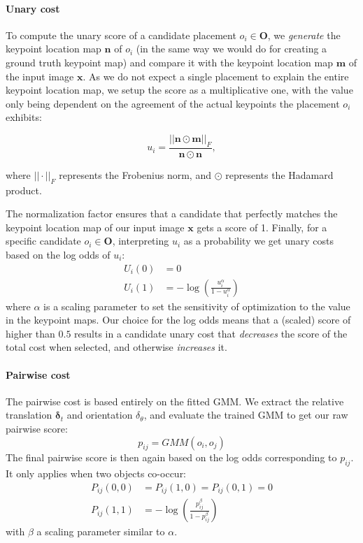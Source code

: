 \documentclass[10pt,twocolumn,letterpaper]{article}
\newcommand{\bb}[1]{{\bm{#1}}}
\begin{document}
\paragraph{Unary cost} To compute the unary score of a candidate placement $o_i \in \bb{O}$,
we \emph{generate} the keypoint location map $\bb{n}$ of $o_i$ (in the same
way we would do for creating a ground truth keypoint map) and compare it with
the keypoint location map $\bb{m}$ of the input image $\bb{x}$.  As we do not expect a
single placement to explain the entire keypoint location map, we setup the score
as a multiplicative one, with the value only being dependent on the agreement
of the actual keypoints the placement $o_i$ exhibits:

\[ u_i = \frac{||\bb{n} \odot \bb{m}||_F}{\bb{n} \odot \bb{n}}, \]

where $||\cdot||_F$ represents the Frobenius norm, and $\odot$ represents the Hadamard product.

The normalization factor ensures that a candidate that perfectly matches the
keypoint location map of our input image $\bb{x}$ gets a score of 1.  Finally, for a specific
candidate $o_i \in \bb{O}$, interpreting $u_i$ as a probability we get unary costs based on the log odds of $u_i$:
\begin{align}
    U_i(0) &= 0 \\
    U_i(1) &= -\log(\frac{u_i^\alpha}{1 - u_i^\alpha})
\end{align}
where $\alpha$ is a scaling parameter to set the sensitivity of optimization to
the value in the keypoint maps. Our choice for the log odds means that a (scaled) score
of higher than $0.5$ results in a candidate unary cost that \emph{decreases} the score of the total
cost when selected, and otherwise \emph{increases} it.

\paragraph{Pairwise cost} The pairwise cost is based entirely on the fitted GMM. We extract
the relative translation $\bb{\delta}_t$ and orientation $\delta_\theta$, and evaluate
the trained GMM to get our raw pairwise score:
\[ p_{ij} = GMM(o_i, o_j) \]
The final pairwise score is then again based on the log odds corresponding to $p_{ij}$. It only applies when two objects co-occur:
\begin{align}
    P_{ij}(0, 0) &= P_{ij}(1, 0) = P_{ij}(0, 1) = 0 \\
    P_{ij}(1, 1) &= -\log(\frac{p_{ij}^\beta}{1 - p_{ij}^\beta})
\end{align}
with $\beta$ a scaling parameter similar to $\alpha$.
\end{document}

